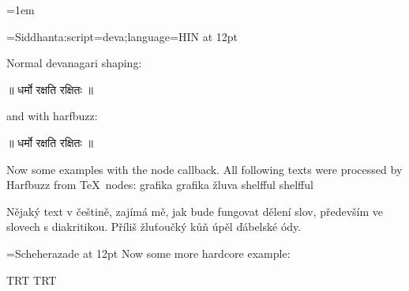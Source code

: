 \documentclass{article}
\begin{document}
\parindent=0pt
\parskip=1em
%  

\frenchspacing %

\font\siddhanta={Siddhanta:script=deva;language=HIN} at 12pt
\bigskip

\siddhanta 

Normal devanagari shaping: 

\stopharfbuzz

॥ धर्मो रक्षति रक्षितः ॥

\startharfbuzz

and with harfbuzz: 


॥ धर्मो रक्षति रक्षितः ॥

\ahoj


Now some examples with the node callback. All following texts were processed by
Harfbuzz from TeX\ nodes: grafika graf\/ika žluva shelfful shelf\/ful


Nějaký text v češtině, zajímá mě, jak bude fungovat dělení slov, především ve
slovech s diakritikou. Příliš žluťoučký kůň úpěl ďábelské ódy. 


\font\amiri={Scheherazade} at 12pt
\amiri
Now some more hardcore example:

\bgroup
\textdir TRT
\pardir TRT
\end{document}
